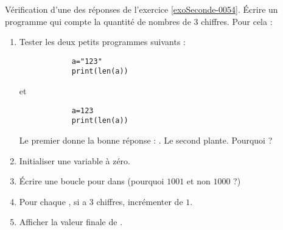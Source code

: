 
\begin{exercice}\label{exoSeconde-0086}

    Vérification d'une des réponses de l'exercice \ref{exoSeconde-0054}. Écrire un programme qui compte la quantité de nombres de \( 3\) chiffres. Pour cela :
    \begin{multicols}{2}
    \begin{enumerate}
        \item
            Tester les deux petits programmes suivants :
            \begin{verbatim}
            a="123"
            print(len(a))
            \end{verbatim}
            et
            \begin{verbatim}
            a=123
            print(len(a))
            \end{verbatim}
            Le premier donne la bonne réponse : . Le second plante. Pourquoi ?
        \item
            Initialiser une variable  à zéro.
        \item
            Écrire une boucle pour  dans  (pourquoi \( 1001\) et non \( 1000\) ?)
        \item
            Pour chaque , si  a \( 3\) chiffres, incrémenter  de \( 1\).
        \item
            Afficher la valeur finale de .
    \end{enumerate}
    \end{multicols}

\end{exercice}
